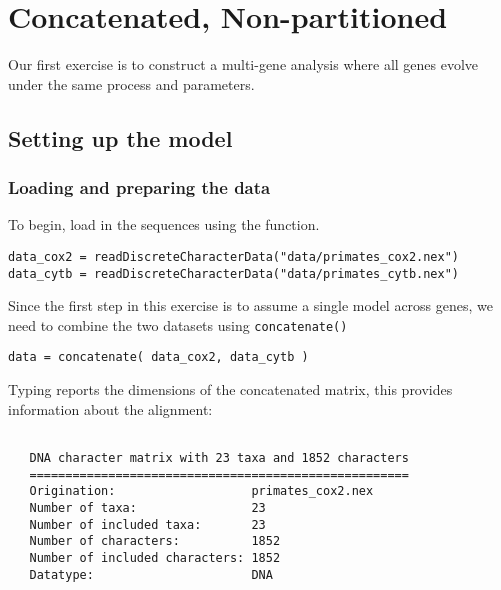 \section{Concatenated, Non-partitioned}\label{sec:unif} 

Our first exercise is to construct a multi-gene analysis where all genes evolve under the same process and parameters.

\subsection{Setting up the model}

\subsubsection{Loading and preparing the data}

To begin, load in the sequences using the  function. 
{\tt \begin{snugshade*}
\begin{lstlisting}
data_cox2 = readDiscreteCharacterData("data/primates_cox2.nex")
data_cytb = readDiscreteCharacterData("data/primates_cytb.nex")
\end{lstlisting}
\end{snugshade*}}

Since the first step in this exercise is to assume a single model across genes, we need to combine the two datasets using {\tt concatenate()}

{\tt \begin{snugshade*}
\begin{lstlisting}
data = concatenate( data_cox2, data_cytb )
\end{lstlisting}
\end{snugshade*}}

Typing  reports the dimensions of the concatenated matrix, this provides information about the alignment:


{\tt \begin{snugshade*}
\begin{lstlisting}

   DNA character matrix with 23 taxa and 1852 characters
   =====================================================
   Origination:                   primates_cox2.nex
   Number of taxa:                23
   Number of included taxa:       23
   Number of characters:          1852
   Number of included characters: 1852
   Datatype:                      DNA

\end{lstlisting}
\end{snugshade*}}

